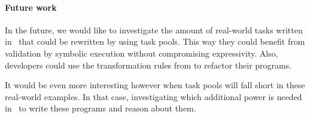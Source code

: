 \paragraph{Future work}
\label{sec:future-work}

In the future, we would like to investigate the amount of real-world tasks written in \ITASKS\ that could be rewritten by using task pools.
This way they could benefit from validation by symbolic execution without compromising expressivity.
Also, developers could use the transformation rules from \citet{conf/sfp/KlijnsmaS22} to refactor their programs.

It would be even more interesting however when task pools will fall short in these real-world examples.
In that case, investigating which additional power is needed in \TOPHAT\ to write these programs and reason about them.